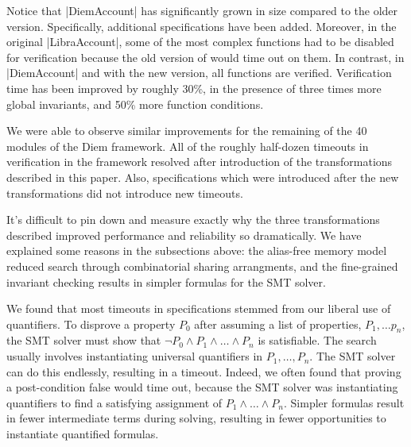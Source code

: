 \noindent Notice that |DiemAccount| has significantly grown in size compared to
the older version. Specifically, additional specifications have been
added. Moreover, in the original |LibraAccount|, some of the most complex
functions had to be disabled for verification because the old version of \MVP
would time out on them. In contrast, in |DiemAccount| and with the new version,
all functions are verified. Verification time has been improved by roughly 30\%,
in the presence of three times more global invariants, and 50\% more function
conditions.

We were able to observe similar improvements for the remaining of the 40 modules
of the Diem framework. All of the roughly half-dozen timeouts in verification in
the framework resolved after introduction of the transformations described in
this paper. Also, specifications which were introduced after the new
transformations did not introduce new timeouts.




It's difficult to pin down and measure exactly why the three transformations
described improved performance and reliability so dramatically.  We have
explained some reasons in the subsections above: the alias-free memory model
reduced search through combinatorial sharing arrangments, and the fine-grained
invariant checking results in simpler formulas for the SMT solver.

We found that most timeouts in specifications stemmed from our liberal use of
quantifiers.  To disprove a property $P_0$ after assuming a list of properties,
$P_1, \ldots p_n$, the SMT solver must show that
$\neg P_0 \wedge P_1 \wedge \ldots \wedge P_n$ is satisfiable.  The search
usually involves instantiating universal quantifiers in $P_1, \ldots, P_n$.  The
SMT solver can do this endlessly, resulting in a timeout. Indeed, we often found
that proving a post-condition false would time out, because the SMT solver was
instantiating quantifiers to find a satisfying assignment of
$P_1 \wedge \ldots \wedge P_n$.  Simpler formulas result in fewer intermediate
terms during solving, resulting in fewer opportunities to instantiate quantified
formulas.

